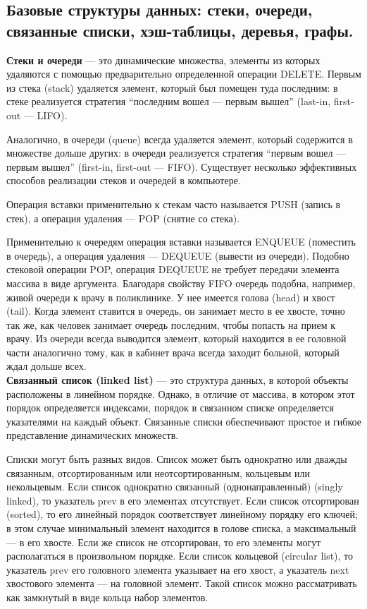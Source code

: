 \documentclass[12pt, a4paper]{article}
\begin{document}
\subsection{Базовые структуры данных: стеки, очереди, связанные списки, хэш-таблицы, деревья, графы.}

\textbf{Стеки и очереди} — это динамические множества, элементы из которых удаляются с помощью предварительно определенной операции DELETE. Первым из стека (stack) удаляется элемент, который был помещен туда последним: в стеке реализуется стратегия “последним вошел — первым вышел” (last-in, first-out — LIFO).

Аналогично, в очереди (queue) всегда удаляется элемент, который содержится
в множестве дольше других: в очереди реализуется стратегия “первым вошел —
первым вышел” (first-in, first-out — FIFO). Существует несколько эффективных
способов реализации стеков и очередей в компьютере. 

Операция вставки применительно к стекам часто называется PUSH (запись
в стек), а операция удаления — POP (снятие со стека).

Применительно к очередям операция вставки называется ENQUEUE (поместить
в очередь), а операция удаления — DEQUEUE (вывести из очереди). Подобно стековой операции POP, операция DEQUEUE не требует передачи элемента массива
в виде аргумента. Благодаря свойству FIFO очередь подобна, например, живой
очереди к врачу в поликлинике. У нее имеется голова (head) и хвост (tail). Когда
элемент ставится в очередь, он занимает место в ее хвосте, точно так же, как
человек занимает очередь последним, чтобы попасть на прием к врачу. Из очереди всегда выводится элемент, который находится в ее головной части аналогично
тому, как в кабинет врача всегда заходит больной, который ждал дольше всех.\\

\textbf{Связанный список (linked list)} — это структура данных, в которой объекты
расположены в линейном порядке. Однако, в отличие от массива, в котором этот
порядок определяется индексами, порядок в связанном списке определяется указателями на каждый объект. Связанные списки обеспечивают простое и гибкое
представление динамических множеств.

Списки могут быть разных видов. Список может быть однократно или дважды
связанным, отсортированным или неотсортированным, кольцевым или некольцевым. Если список однократно связанный (однонаправленный) (singly linked), то
указатель prev в его элементах отсутствует. Если список отсортирован (sorted),
то его линейный порядок соответствует линейному порядку его ключей; в этом
случае минимальный элемент находится в голове списка, а максимальный — в его
хвосте. Если же список не отсортирован, то его элементы могут располагаться в произвольном порядке. Если список кольцевой (circular list), то указатель prev его головного элемента указывает на его хвост, а указатель next хвостового
элемента — на головной элемент. Такой список можно рассматривать как замкнутый в виде кольца набор элементов.\\
\end{document}
